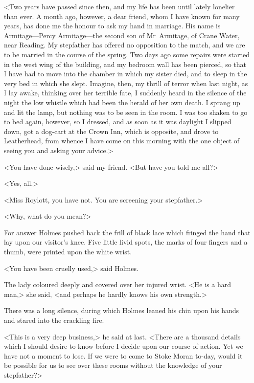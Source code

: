 <Two years have passed since then, and my life has been until lately lonelier than ever. A month ago, however, a dear friend, whom I have known for many years, has done me the honour to ask my hand in marriage. His name is Armitage—Percy Armitage—the second son of Mr~Armitage, of Crane Water, near Reading. My stepfather has offered no opposition to the match, and we are to be married in the course of the spring. Two days ago some repairs were started in the west wing of the building, and my bedroom wall has been pierced, so that I have had to move into the chamber in which my sister died, and to sleep in the very bed in which she slept. Imagine, then, my thrill of terror when last night, as I lay awake, thinking over her terrible fate, I suddenly heard in the silence of the night the low whistle which had been the herald of her own death. I sprang up and lit the lamp, but nothing was to be seen in the room. I was too shaken to go to bed again, however, so I dressed, and as soon as it was daylight I slipped down, got a dog-cart at the Crown Inn, which is opposite, and drove to Leatherhead, from whence I have come on this morning with the one object of seeing you and asking your advice.>

<You have done wisely,> said my friend. <But have you told me all?>

<Yes, all.>

<Miss Roylott, you have not. You are screening your stepfather.>

<Why, what do you mean?>

For answer Holmes pushed back the frill of black lace which fringed the hand that lay upon our visitor's knee. Five little livid spots, the marks of four fingers and a thumb, were printed upon the white wrist.

<You have been cruelly used,> said Holmes.

The lady coloured deeply and covered over her injured wrist. <He is a hard man,> she said, <and perhaps he hardly knows his own strength.>

There was a long silence, during which Holmes leaned his chin upon his hands and stared into the crackling fire.

<This is a very deep business,> he said at last. <There are a thousand details which I should desire to know before I decide upon our course of action. Yet we have not a moment to lose. If we were to come to Stoke Moran to-day, would it be possible for us to see over these rooms without the knowledge of your stepfather?>

